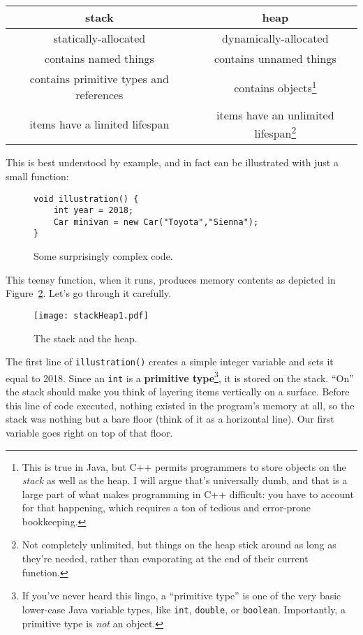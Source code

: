 \vspace{.2in}
\begin{tabular}{c|c}
\textbf{stack} & \textbf{heap} \\
\hline
statically-allocated & dynamically-allocated \\
contains named things & contains unnamed things \\
contains primitive types and references & contains objects\footnote{This is
true in Java, but C++ permits programmers to store objects on the
\textit{stack} as well as the heap. I will argue that's universally dumb, and
that is a large part of what makes programming in C++ difficult: you have to
account for that happening, which requires a ton of tedious and error-prone
bookkeeping.} \\
items have a limited lifespan & items have an unlimited lifespan\footnote{Not
completely unlimited, but things on the heap stick around as long as they're
needed, rather than evaporating at the end of their current function.} \\
\end{tabular}
\vspace{.2in}

This is best understood by example, and in fact can be illustrated with just a
small function:

\begin{figure}[ht]
\begin{Verbatim}[fontsize=\small,samepage=true,frame=single]
void illustration() {
    int year = 2018;
    Car minivan = new Car("Toyota","Sienna");
}
\end{Verbatim}
\caption{Some surprisingly complex code.}
\label{fig:firstCode}
\end{figure}

This teensy function, when it runs, produces memory contents as depicted in
Figure~\ref{fig:stackHeap1}. Let's go through it carefully.

\begin{figure}[ht]   %
\centering
\texttt{[image: stackHeap1.pdf]}
\caption{The stack and the heap.}
\label{fig:stackHeap1}
\end{figure}

The first line of \texttt{illustration()} creates a simple integer variable
and sets it equal to 2018. Since an \texttt{int} is a \textbf{primitive
type}\footnote{If you've never heard this lingo, a ``primitive type'' is one of
the very basic lower-case Java variable types, like \texttt{int},
\texttt{double}, or \texttt{boolean}. Importantly, a primitive type is
\textit{not} an object.}, it is stored on the stack. ``On'' the stack should
make you think of layering items vertically on a surface. Before this line of
code executed, nothing existed in the program's memory at all, so the stack
was nothing but a bare floor (think of it as a horizontal line). Our first
variable goes right on top of that floor.


